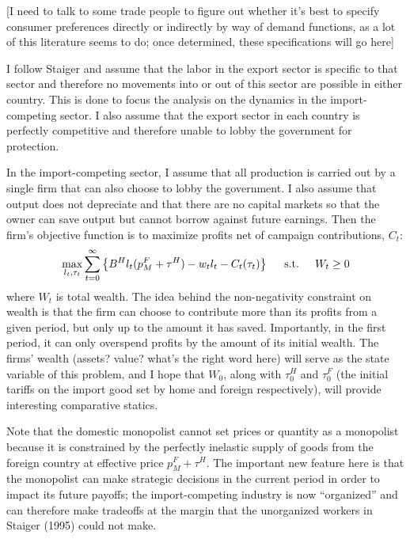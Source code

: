 \documentclass[12pt]{article}
\begin{document}
[I need to talk to some trade people to figure out whether it's best to specify consumer preferences directly or indirectly by way of demand functions, as a lot of this literature seems to do; once determined, these specifications will go here]

I follow Staiger and assume that the labor in the export sector is specific to that sector and therefore no movements into or out of this sector are possible in either country. This is done to focus the analysis on the dynamics in the import-competing sector. I also assume that the export sector in each country is perfectly competitive and therefore unable to lobby the government for protection.

In the import-competing sector, I assume that all production is carried out by a single firm that can also choose to lobby the government. I also assume that output does not depreciate and that there are no capital markets so that the owner can save output but cannot borrow against future earnings. Then the firm's objective function is to maximize profits net of campaign contributions, $C_t$:
\[
  \max_{l_t,\tau_t} \sum_{t=0}^\infty \left\{B^H l_t(p_M^F + \tau^H) - w_t l_t - C_t(\tau_t) \right\} \hskip.2in \text{s.t.} \hskip.2in W_t \geq 0
\]
where $W_t$ is total wealth. The idea behind the non-negativity constraint on wealth is that the firm can choose to contribute more than its profits from a given period, but only up to the amount it has saved. Importantly, in the first period, it can only overspend profits by the amount of its initial wealth. The firms' wealth (assets? value? what's the right word here) will serve as the state variable of this problem, and I hope that $W_0$, along with $\tau_0^H$ and $\tau_0^F$ (the initial tariffs on the import good set by home and foreign respectively), will provide interesting comparative statics.

Note that the domestic monopolist cannot set prices or quantity as a monopolist because it is constrained by the perfectly inelastic supply of goods from the foreign country at effective price $p_M^F + \tau^H$. The important new feature here is that the monopolist can make strategic decisions in the current period in order to impact its future payoffs; the import-competing industry is now ``organized'' and can therefore make tradeoffs at the margin that the unorganized workers in Staiger (1995) could not make.
\end{document}
